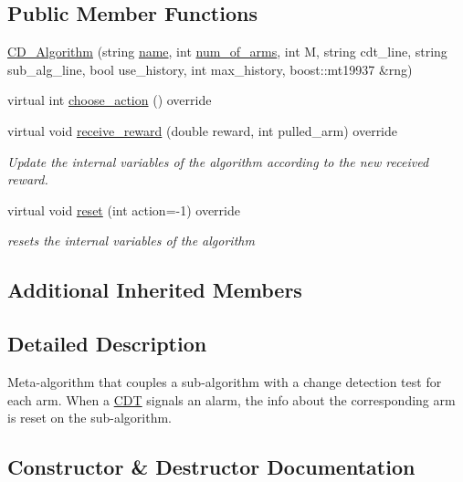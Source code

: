 \subsection*{Public Member Functions}
\begin{DoxyCompactItemize}
\item 
\mbox{\hyperlink{class_c_d___algorithm_a3fcecaa468fa082e20461c53ab366550}{C\+D\+\_\+\+Algorithm}} (string \mbox{\hyperlink{class_m_a_b_algorithm_a77b10ecc4b49d519c557f65358167b82}{name}}, int \mbox{\hyperlink{class_m_a_b_algorithm_a340fa9e83e85b092f2c6125fc4e8549b}{num\+\_\+of\+\_\+arms}}, int M, string cdt\+\_\+line, string sub\+\_\+alg\+\_\+line, bool use\+\_\+history, int max\+\_\+history, boost\+::mt19937 \&rng)
\item 
virtual int \mbox{\hyperlink{class_c_d___algorithm_a10d80cbf4687e2c0ef69466ee6deb1a9}{choose\+\_\+action}} () override
\item 
virtual void \mbox{\hyperlink{class_c_d___algorithm_a2427ddf68550eda00a0992b875c10834}{receive\+\_\+reward}} (double reward, int pulled\+\_\+arm) override
\begin{DoxyCompactList}\small\item\em Update the internal variables of the algorithm according to the new received reward. \end{DoxyCompactList}\item 
virtual void \mbox{\hyperlink{class_c_d___algorithm_a493e6eaafb4ab105c94e9e4c33143d39}{reset}} (int action=-\/1) override
\begin{DoxyCompactList}\small\item\em resets the internal variables of the algorithm \end{DoxyCompactList}\end{DoxyCompactItemize}
\subsection*{Additional Inherited Members}


\subsection{Detailed Description}
Meta-\/algorithm that couples a sub-\/algorithm with a change detection test for each arm. When a \mbox{\hyperlink{class_c_d_t}{C\+DT}} signals an alarm, the info about the corresponding arm is reset on the sub-\/algorithm. 

\subsection{Constructor \& Destructor Documentation}
\mbox{\label{class_c_d___algorithm_a3fcecaa468fa082e20461c53ab366550}} 
